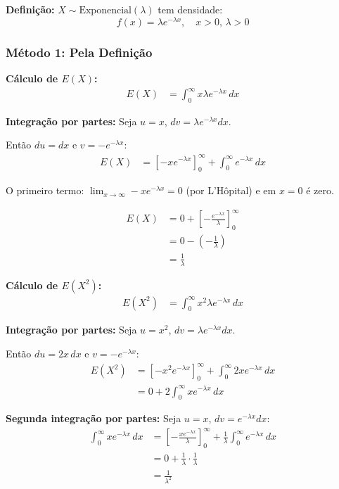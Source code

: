 \documentclass[12pt,a4paper]{article}
\theoremstyle{plain}
\theoremstyle{definition}
\theoremstyle{remark}
\begin{document}
\textbf{Definição:} \(X \sim \text{Exponencial}(\lambda)\) tem densidade:
\[
f(x) = \lambda e^{-\lambda x}, \quad x > 0, \, \lambda > 0
\]

\subsubsection{Método 1: Pela Definição}

\textbf{Cálculo de \(E(X)\):}
\begin{align}
E(X) &= \int_0^{\infty} x \lambda e^{-\lambda x} \, dx
\end{align}

\textbf{Integração por partes:} Seja \(u = x\), \(dv = \lambda e^{-\lambda x} dx\).

Então \(du = dx\) e \(v = -e^{-\lambda x}\):
\begin{align}
E(X) &= \left[ -x e^{-\lambda x} \right]_0^{\infty} + \int_0^{\infty} e^{-\lambda x} \, dx
\end{align}

O primeiro termo: \(\lim_{x \to \infty} -xe^{-\lambda x} = 0\) (por L'Hôpital) e em \(x=0\) é zero.

\begin{align}
E(X) &= 0 + \left[ -\frac{e^{-\lambda x}}{\lambda} \right]_0^{\infty} \\
&= 0 - \left(-\frac{1}{\lambda}\right) \\
&= \frac{1}{\lambda}
\end{align}

\textbf{Cálculo de \(E(X^2)\):}
\begin{align}
E(X^2) &= \int_0^{\infty} x^2 \lambda e^{-\lambda x} \, dx
\end{align}

\textbf{Integração por partes:} Seja \(u = x^2\), \(dv = \lambda e^{-\lambda x} dx\).

Então \(du = 2x \, dx\) e \(v = -e^{-\lambda x}\):
\begin{align}
E(X^2) &= \left[ -x^2 e^{-\lambda x} \right]_0^{\infty} + \int_0^{\infty} 2x e^{-\lambda x} \, dx \\
&= 0 + 2 \int_0^{\infty} x e^{-\lambda x} \, dx
\end{align}

\textbf{Segunda integração por partes:} Seja \(u = x\), \(dv = e^{-\lambda x} dx\):
\begin{align}
\int_0^{\infty} x e^{-\lambda x} \, dx &= \left[ -\frac{x e^{-\lambda x}}{\lambda} \right]_0^{\infty} + \frac{1}{\lambda} \int_0^{\infty} e^{-\lambda x} \, dx \\
&= 0 + \frac{1}{\lambda} \cdot \frac{1}{\lambda} \\
&= \frac{1}{\lambda^2}
\end{align}
\end{document}
